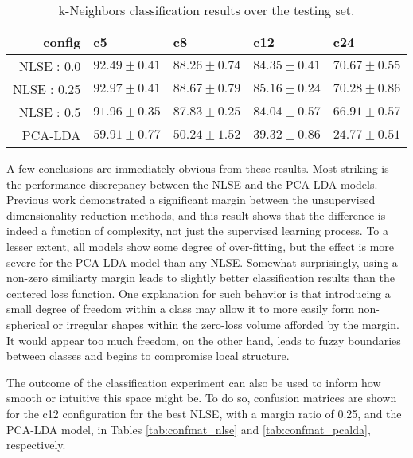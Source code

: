 \begin{table*}[h]
\begin{center}
\caption{k-Neighbors classification results over the testing set.}
\small
\begin{tabular}{rllll}
\hline
config & c5  & c8  & c12   & c24   \\
\hline
 NLSE : 0.0  & $92.49\pm0.41$ & $88.26\pm0.74$ & $84.35\pm0.41$ & $70.67\pm0.55$ \\
 NLSE : 0.25 & $92.97\pm0.41$ & $88.67\pm0.79$ & $85.16\pm0.24$ & $70.28\pm0.86$ \\
 NLSE : 0.5  & $91.96\pm0.35$ & $87.83\pm0.25$ & $84.04\pm0.57$ & $66.91\pm0.57$ \\
 \hline
 PCA-LDA  & $59.91\pm0.77$ & $50.24\pm1.52$ & $39.32\pm0.86$ & $24.77\pm0.51$ \\
\hline
\end{tabular}
\label{tab:things}
\end{center}
\end{table*}


A few conclusions are immediately obvious from these results.
Most striking is the performance discrepancy between the NLSE and the PCA-LDA models.
Previous work demonstrated a significant margin between the unsupervised dimensionality reduction methods, and this result shows that the difference is indeed a function of complexity, not just the supervised learning process.
To a lesser extent, all models show some degree of over-fitting, but the effect is more severe for the PCA-LDA model than any NLSE.
Somewhat surprisingly, using a non-zero similiarty margin leads to slightly better classification results than the centered loss function.
One explanation for such behavior is that introducing a small degree of freedom within a class may allow it to more easily form non-spherical or irregular shapes within the zero-loss volume afforded by the margin.
It would appear too much freedom, on the other hand, leads to fuzzy boundaries between classes and begins to compromise local structure.


The outcome of the classification experiment can also be used to inform how smooth or intuitive this space might be.
To do so, confusion matrices are shown for the c12 configuration for the best NLSE, with a margin ratio of 0.25, and the PCA-LDA model, in Tables \ref{tab:confmat_nlse} and \ref{tab:confmat_pcalda}, respectively.



